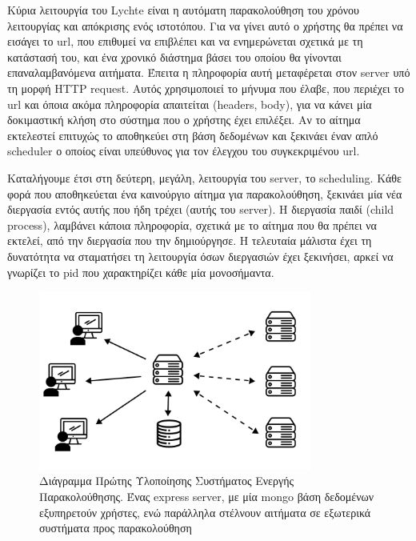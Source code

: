 Κύρια λειτουργία του Lychte είναι η αυτόματη παρακολούθηση του χρόνου λειτουργίας και απόκρισης ενός ιστοτόπου.
Για να γίνει αυτό ο χρήστης θα πρέπει να εισάγει το url, που επιθυμεί να επιβλέπει και να ενημερώνεται σχετικά με
τη κατάστασή του, και ένα χρονικό διάστημα βάσει του οποίου θα γίνονται επαναλαμβανόμενα αιτήματα.
Έπειτα η πληροφορία αυτή μεταφέρεται στον server υπό τη μορφή HTTP request. Αυτός χρησιμοποιεί το μήνυμα που έλαβε, που περιέχει το url και
όποια ακόμα πληροφορία απαιτείται (headers, body), για να κάνει μία δοκιμαστική κλήση στο σύστημα που ο χρήστης έχει επιλέξει. Αν το αίτημα εκτελεστεί επιτυχώς
το αποθηκεύει στη βάση δεδομένων και ξεκινάει έναν απλό scheduler
ο οποίος είναι υπεύθυνος για τον έλεγχου του συγκεκριμένου url.

Καταλήγουμε έτσι στη δεύτερη, μεγάλη, λειτουργία του server, το scheduling. Κάθε φορά που αποθηκεύεται ένα καινούργιο
αίτημα για παρακολούθηση, ξεκινάει μία νέα διεργασία εντός αυτής που ήδη τρέχει (αυτής του server). Η διεργασία παιδί (child process),
λαμβάνει κάποια πληροφορία, σχετικά με το αίτημα που θα πρέπει να εκτελεί, από την διεργασία που την δημιούργησε. Η τελευταία μάλιστα
έχει τη δυνατότητα να σταματήσει τη λειτουργία όσων διεργασιών έχει ξεκινήσει, αρκεί να γνωρίζει το pid που χαρακτηρίζει κάθε μία μονοσήμαντα.

\begin{figure}[!ht]
	\centering
	\includegraphics[width=0.8\textwidth]{./images/chapter4/lychte-first-implementation.png}
	\caption[Διάγραμμα πρώτης Υλοποίησης]{Διάγραμμα Πρώτης Υλοποίησης Συστήματος Ενεργής Παρακολούθησης. Ένας express server, με μία mongo βάση δεδομένων εξυπηρετούν χρήστες, ενώ παράλληλα στέλνουν αιτήματα σε εξωτερικά συστήματα προς παρακολούθηση}
	\label{fig:first_implementation}
\end{figure}

